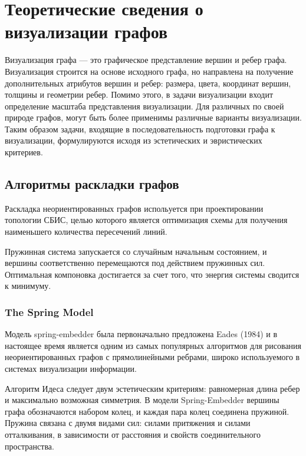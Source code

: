 \chapter{Теоретические сведения о визуализации графов}
Визуализация графа — это графическое представление вершин и ребер графа. 
Визуализация строится на основе исходного графа, но направлена на получение дополнительных атрибутов вершин и ребер: размера, цвета, 
координат вершин, толщины и геометрии ребер. Помимо этого, в задачи визуализации входит определение масштаба представления визуализации. 
Для различных по своей природе графов, могут быть более применимы различные варианты визуализации. 
Таким образом задачи, входящие в последовательность подготовки графа к визуализации, формулируются исходя из эстетических и эвристических критериев.

\section{Алгоритмы раскладки графов}

Раскладка неориентированных графов испольуется при проектировании топологии СБИС, 
целью которого является оптимизация схемы для получения наименьшего количества пересечений линий. 

Пружинная система запускается со случайным начальным состоянием, и вершины соответственно перемещаются под действием пружинных сил. 
Оптимальная компоновка достигается за счет того, что энергия системы сводится к минимуму.

\subsection{The Spring Model}
Модель spring-embedder была первоначально предложена Eades (1984) и в настоящее время является одним из самых популярных алгоритмов 
для рисования неориентированных графов с прямолинейными ребрами, широко используемого в системах визуализации информации.

Алгоритм Идеса следует двум эстетическим критериям: равномерная длина ребер и максимально возможная симметрия. 
В модели Spring-Embedder вершины графа обозначаются набором колец, и каждая пара колец соединена пружиной. 
Пружина связана с двумя видами сил: силами притяжения и силами отталкивания, в зависимости от расстояния и свойств соединительного пространства.

